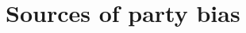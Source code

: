 \documentclass[letter,12pt]{article}
\begin{document}



\section{Sources of party bias}
\end{document}
